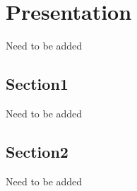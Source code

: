 \chapter{Presentation}
Need to be added
\section{Section1}
Need to be added
\section{Section2}
Need to be added
